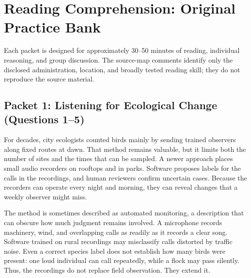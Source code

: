 
\renewcommand{\labelenumii}{(\Alph{enumii})}

\section*{Reading Comprehension: Original Practice Bank}

\begin{center}
\end{center}

Each packet is designed for approximately 30--50 minutes of reading, individual
reasoning, and group discussion. The source-map comments identify only the
disclosed administration, location, and broadly tested reading skill; they do not
reproduce the source material.

\subsection*{Packet 1: Listening for Ecological Change (Questions 1--5)}

For decades, city ecologists counted birds mainly by sending trained observers
along fixed routes at dawn. That method remains valuable, but it limits both the
number of sites and the times that can be sampled. A newer approach places small
audio recorders on rooftops and in parks. Software proposes labels for the calls
in the recordings, and human reviewers confirm uncertain cases. Because the
recorders can operate every night and morning, they can reveal changes that a
weekly observer might miss.

The method is sometimes described as automated monitoring, a description that
can obscure how much judgment remains involved. A microphone records machinery,
wind, and overlapping calls as readily as it records a clear song. Software
trained on rural recordings may misclassify calls distorted by traffic noise.
Even a correct species label does not establish how many birds were present: one
loud individual can call repeatedly, while a flock may pass silently. Thus, the
recordings do not replace field observation. They extend it.

